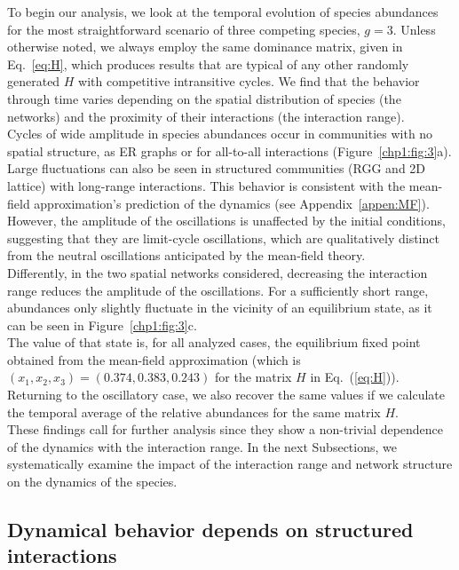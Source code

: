 To begin our analysis, we look at the temporal evolution of species abundances for the most straightforward scenario of three competing species, $g=3$. Unless otherwise noted, we always employ the same dominance matrix, given in Eq.~\eqref{eq:H}, which produces results that are typical of any other randomly generated $H$ with competitive intransitive cycles. We find that the behavior through time varies depending on the spatial distribution of species (the networks) and the proximity of their interactions (the interaction range). \\

Cycles of wide amplitude in species abundances occur in communities with no spatial structure, as ER graphs or for all-to-all interactions (Figure~\ref{chp1:fig:3}a). Large fluctuations can also be seen in structured communities (RGG and 2D lattice) with long-range interactions. This behavior is consistent with the mean-field approximation's prediction of the dynamics (see Appendix~\ref{appen:MF}). However, the amplitude of the oscillations is unaffected by the initial conditions, suggesting that they are limit-cycle oscillations, which are qualitatively distinct from the neutral oscillations anticipated by the mean-field theory. \\

Differently, in the two spatial networks considered, decreasing the interaction range reduces the amplitude of the oscillations. For a sufficiently short range,  abundances only slightly fluctuate in the vicinity of an equilibrium state, as it can be seen in Figure~\ref{chp1:fig:3}c.  \\

The value of that state is, for all analyzed cases, the equilibrium fixed point obtained from the mean-field approximation (which is $(x_1,x_2,x_3)=(0.374, 0.383, 0.243)$ for the matrix $H$ in Eq.~(\ref{eq:H})). Returning to the oscillatory case, we also recover the same values if we calculate the temporal average of the relative abundances for the same matrix $H$.  \\

These findings call for further analysis since they show a non-trivial dependence of the dynamics with the interaction range. In the next Subsections, we systematically examine the impact of the interaction range and network structure on the dynamics of the species.

\subsection{\label{chp1:2.2}Dynamical behavior depends on structured interactions} 

